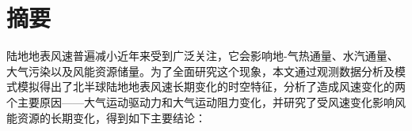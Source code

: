 \maketitle%
\MAKETITLE%
\makedeclaration%
\intobmk\chapter*{摘\quad 要}%
\setcounter{page}{1}%

陆地地表风速普遍减小近年来受到广泛关注，它会影响地-气热通量、水汽通量、大气污染以及风能资源储量。为了全面研究这个现象，本文通过观测数据分析及模式模拟得出了北半球陆地地表风速长期变化的时空特征，分析了造成风速变化的两个主要原因——大气运动驱动力和大气运动阻力变化，并研究了受风速变化影响风能资源的长期变化，得到如下主要结论：

